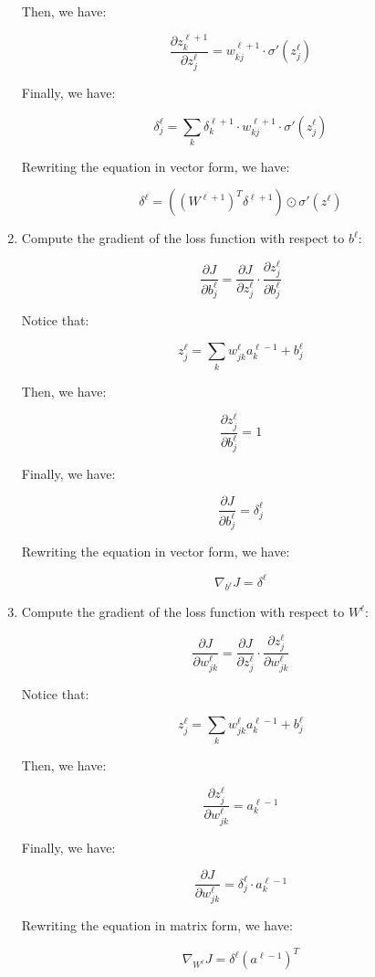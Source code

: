 \begin{enumerate}
    Then, we have:

    $$\frac{\partial z^{\ell+1}_k}{\partial z^\ell_j} = w^{\ell+1}_{kj} \cdot \sigma'(z^\ell_j)$$

    Finally, we have:

    $$\delta^\ell_j = \sum_{k} \delta^{\ell+1}_k \cdot w^{\ell+1}_{kj} \cdot \sigma'(z^\ell_j)$$

    Rewriting the equation in vector form, we have:

    \begin{equation}
        \delta^\ell = ((W^{\ell+1})^T \delta^{\ell+1}) \odot \sigma'(z^\ell)
    \end{equation}

    \item Compute the gradient of the loss function with respect to $b^\ell$:
    
    $$\frac{\partial J}{\partial b^\ell_j} = \frac{\partial J}{\partial z^\ell_j} \cdot \frac{\partial z^\ell_j}{\partial b^\ell_j}$$

    Notice that:

    $$z_j^\ell = \sum_{k} w_{jk}^\ell a_k^{\ell-1} + b_j^\ell$$

    Then, we have:

    $$\frac{\partial z^\ell_j}{\partial b^\ell_j} = 1$$

    Finally, we have:

    $$\frac{\partial J}{\partial b^\ell_j} = \delta^\ell_j$$

    Rewriting the equation in vector form, we have:

    \begin{equation}
        \nabla_{b^\ell} J = \delta^\ell
    \end{equation}

    \item Compute the gradient of the loss function with respect to $W^\ell$:
    
    $$\frac{\partial J}{\partial w^\ell_{jk}} = \frac{\partial J}{\partial z^\ell_j} \cdot \frac{\partial z^\ell_j}{\partial w^\ell_{jk}}$$

    Notice that:

    $$z_j^\ell = \sum_{k} w_{jk}^\ell a_k^{\ell-1} + b_j^\ell$$

    Then, we have:

    $$\frac{\partial z^\ell_j}{\partial w^\ell_{jk}} = a_k^{\ell-1}$$

    Finally, we have:

    $$\frac{\partial J}{\partial w^\ell_{jk}} = \delta^\ell_j \cdot a_k^{\ell-1}$$

    Rewriting the equation in matrix form, we have:

    \begin{equation}
        \nabla_{W^\ell} J = \delta^\ell (a^{\ell-1})^T
    \end{equation}

\end{enumerate}

